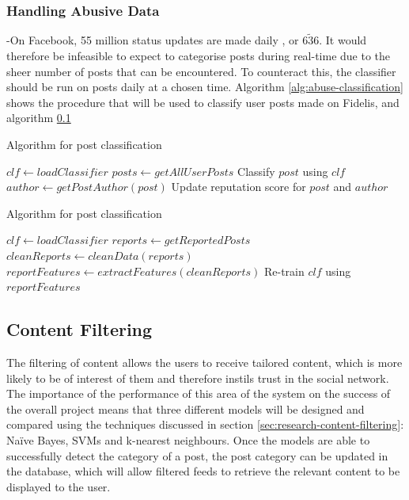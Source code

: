 \subsubsection{Handling Abusive Data}
-On Facebook, 55 million status updates are made daily \cite{kissmetrics:fb-stats}, or $\tilde{636}$. It would therefore be infeasible to expect to categorise posts during real-time due to the sheer number of posts that can be encountered. To counteract this, the classifier should be run on posts daily at a chosen time. 
Algorithm \ref{alg:abuse-classification} shows the procedure that will be used to classify user posts made on Fidelis, and algorithm \ref{}
\begin{algorithm}
\caption{Algorithm for post classification}
\label{alg:abuse-classification}
\begin{algorithmic}[1]
\State $clf\gets loadClassifier$
\State $posts\gets getAllUserPosts$
	\State Classify $post$ using $clf$
		\State $author\gets getPostAuthor(post)$
		\State Update reputation score for $post$ and $author$
	\EndIf
\EndFor
\end{algorithmic}
\end{algorithm}

\begin{algorithm}
\caption{Algorithm for post classification}
\label{alg:abuse-retrain}
\begin{algorithmic}[1]
\State $clf\gets loadClassifier$
\State $reports\gets getReportedPosts$
\State $cleanReports\gets cleanData(reports)$
\State $reportFeatures\gets extractFeatures(cleanReports)$
\State Re-train $clf$ using $reportFeatures$
\end{algorithmic}
\end{algorithm}

\subsection{Content Filtering}
The filtering of content allows the users to receive tailored content, which is more likely to be of interest of them and therefore instils trust in the social network. The importance of the performance of this area of the system on the success of the overall project means that three different models will be designed and compared using the techniques discussed in section \ref{sec:research-content-filtering}: Na\"ive Bayes, SVMs and k-nearest neighbours. Once the models are able to successfully detect the category of a post, the post category can be updated in the database, which will allow filtered feeds to retrieve the relevant content to be displayed to the user. 

